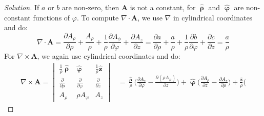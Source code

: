             \begin{proof}[Solution]
                If $a$ or $b$ are non-zero, then $\mathbf{A}$
                is not a constant, for
                $\hat{\boldsymbol{\uprho}}$ and
                $\hat{\boldsymbol{\upvarphi}}$ are
                non-constant functions of $\varphi$. To compute
                $\nabla\cdot\mathbf{A}$, we use $\nabla$ in
                cylindrical coordinates and do:
                \begin{equation*}
                    \nabla\cdot\mathbf{A}
                    =\frac{\partial{A_{\rho}}}{\partial\rho}
                    +\frac{A_{\rho}}{\rho}
                    +\frac{1}{\rho}
                     \frac{\partial{A_{\phi}}}{\partial\varphi}
                    +\frac{\partial{A_{z}}}{\partial{z}}
                    =\frac{\partial{a}}{\partial\rho}
                    +\frac{a}{\rho}
                    +\frac{1}{\rho}
                     \frac{\partial{b}}{\partial\varphi}
                    +\frac{\partial{c}}{\partial{z}}
                    =\frac{a}{\rho}
                \end{equation*}
                For $\nabla\times\mathbf{A}$,
                we again use cylindrical coordinates and do:
                \begin{align*}
                    \nabla\times\mathbf{A}
                    =
                    \begin{vmatrix}
                        \frac{1}{\rho}\hat{\boldsymbol{\uprho}}
                        &\hat{\boldsymbol{\upvarphi}}
                        &\frac{1}{\rho}\hat{\mathbf{z}}\\
                        \frac{\partial}{\partial\rho}
                        &\frac{\partial}{\partial\varphi}
                        &\frac{\partial}{\partial{z}}\\
                        A_{\rho}
                        &\rho{A_{\varphi}}
                        &A_{z}
                    \end{vmatrix}
                    &=\frac{\hat{\boldsymbol{\uprho}}}{\rho}\bigg(
                        \frac{\partial{A_{z}}}{\partial\varphi}
                        -\frac{\partial(\rho{A_{\varphi}})}
                              {\partial{z}}
                    \bigg)
                    +\hat{\boldsymbol{\upvarphi}}\bigg(
                        \frac{\partial{A_{\rho}}}{\partial{z}}
                        -\frac{\partial{A_{z}}}{\partial\rho}
                    \bigg)
                    +\frac{\hat{\mathbf{z}}}{\rho}\bigg(

\end{align*}
\end{proof}
